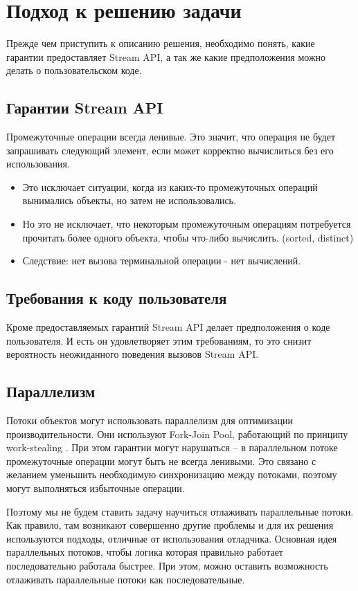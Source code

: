 \section{Подход к решению задачи}
Прежде чем приступить к описанию решения, необходимо понять, какие гарантии предоставляет Stream API, а так же какие предположения можно делать о пользовательском коде.

\subsection{Гарантии Stream API}
Промежуточные операции всегда ленивые. Это значит, что операция не будет запрашивать следующий элемент, если может корректно вычислиться без его использования.
\begin{itemize}
	\item Это исключает ситуации, когда из каких-то промежуточных операций вынимались объекты, но затем не использовались.
	\item Но это не исключает, что некоторым промежуточным операциям потребуется прочитать более одного объекта, чтобы что-либо вычислить. (sorted, distinct)
	\item Следствие: нет вызова терминальной операции - нет вычислений.
\end{itemize}

\subsection{Требования к коду пользователя}
Кроме предоставляемых гарантий Stream API делает предположения о коде пользователя. И есть он удовлетворяет этим требованиям, то это снизит вероятность неожиданного поведения вызовов Stream API.

\subsection{Параллелизм}
Потоки объектов могут использовать параллелизм для оптимизации производительности. Они используют Fork-Join Pool, работающий по принципу work-stealing \cite{wiki:worksteal}. При этом гарантии могут нарушаться -- в параллельном потоке промежуточные операции могут быть не всегда ленивыми. Это связано с желанием уменьшить необходимую синхронизацию между потоками, поэтому могут выполняться избыточные операции.

Поэтому мы не будем ставить задачу научиться отлаживать параллельные потоки. Как правило, там возникают совершенно другие проблемы и для их решения используются подходы, отличные от использования отладчика. Основная идея параллельных потоков, чтобы логика которая правильно работает последовательно работала быстрее. При этом, можно оставить возможность отлаживать параллельные потоки как последовательные.

